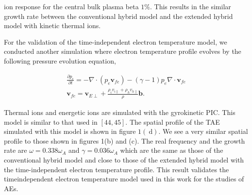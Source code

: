 \documentclass[10pt]{article}
\begin{document}
ion response for the central bulk plasma beta $1 \%$. This results in the similar growth rate between the conventional hybrid model and the extended hybrid model with kinetic thermal ions.

For the validation of the time-independent electron temperature model, we conducted another simulation where electron temperature profile evolves by the following pressure evolution equation,

$$
\begin{gathered}
\frac{\partial p_{e}}{\partial t}=-\nabla \cdot\left(p_{e} \mathbf{v}_{f e}\right)-(\gamma-1) p_{e} \nabla \cdot \mathbf{v}_{f e} \\
\mathbf{v}_{f e}=\mathbf{v}_{E \perp}+\frac{\rho_{i} v_{i \|}+\rho_{h} v_{h \|}}{\rho} \mathbf{b} .
\end{gathered}
$$

Thermal ions and energetic ions are simulated with the gyrokinetic PIC. This model is similar to that used in $[44,45]$. The spatial profile of the TAE simulated with this model is shown in figure $1(\mathrm{~d})$. We see a very similar spatial profile to those shown in figures 1(b) and (c). The real frequency and the growth rate are $\omega=0.338 \omega_{A}$ and $\gamma=0.036 \omega_{A}$ which are the same as those of the conventional hybrid model and close to those of the extended hybrid model with the time-independent electron temperature profile. This result validates the timeindependent electron temperature model used in this work for the studies of AEs.
\end{document}
